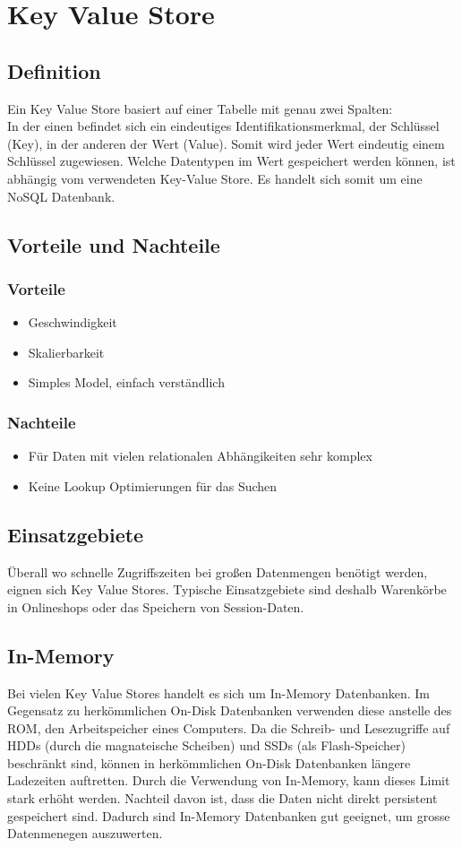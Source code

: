 \section{Key Value Store}
\subsection{Definition}
Ein Key Value Store basiert auf einer Tabelle mit genau zwei Spalten: \\
In der einen befindet sich ein eindeutiges Identifikationsmerkmal, der Schlüssel (Key), in der anderen der Wert (Value).
Somit wird jeder Wert eindeutig einem Schlüssel zugewiesen.
Welche Datentypen im Wert gespeichert werden können, ist abhängig vom verwendeten Key-Value Store.
Es handelt sich somit um eine NoSQL Datenbank.
\subsection{Vorteile und Nachteile}
\subsubsection{Vorteile}
\begin{itemize}
	\item Geschwindigkeit
	\item Skalierbarkeit
	\item Simples Model, einfach verständlich
\end{itemize}
\subsubsection{Nachteile}
\begin{itemize}
	\item Für Daten mit vielen relationalen Abhängikeiten sehr komplex
	\item Keine Lookup Optimierungen für das Suchen
\end{itemize}
\subsection{Einsatzgebiete}
Überall wo schnelle Zugriffszeiten bei großen Datenmengen benötigt werden, eignen sich Key Value Stores. Typische Einsatzgebiete sind deshalb Warenkörbe in Onlineshops oder das Speichern von Session-Daten.

\subsection{In-Memory}
Bei vielen Key Value Stores handelt es sich um In-Memory Datenbanken. Im Gegensatz zu herkömmlichen On-Disk Datenbanken verwenden diese anstelle des ROM, den Arbeitspeicher eines Computers. Da die Schreib- und Lesezugriffe auf HDDs (durch die magnateische Scheiben) und SSDs (als Flash-Speicher) beschränkt sind, können in herkömmlichen On-Disk Datenbanken längere Ladezeiten auftretten. Durch die Verwendung von In-Memory, kann dieses Limit stark erhöht werden. Nachteil davon ist, dass die Daten nicht direkt persistent gespeichert sind.
Dadurch sind In-Memory Datenbanken gut geeignet, um grosse Datenmenegen auszuwerten.
\clearpage
